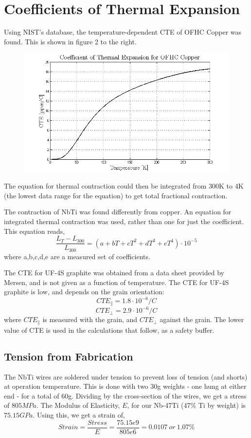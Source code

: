 \documentclass{article}
\begin{document}
\newpage
\section{Coefficients of Thermal Expansion}

Using NIST's database, the temperature-dependent CTE of OFHC Copper was found. This is shown in figure 2 to the right.

\begin{figure}
\includegraphics[width = .5\textwidth]{CTE_Copper_plot.png}
\end{figure} 

The equation for thermal contraction could then be integrated from 300K to 4K (the lowest data range for the equation) to get total fractional contraction. 

The contraction of NbTi was found differently from copper. An equation for integrated thermal contraction was used, rather than one for just the coefficient. This equation reads,
$$
\frac{L_{T} - L_{300}}{L_{300}} = (a + bT + cT^2 + dT^3 + eT^4) \cdot 10^{-5}
$$
where a,b,c,d,e are a measured set of coefficients. 

The CTE for UF-4S graphite was obtained from a data sheet provided by Mersen, and is not given as a function of temperature. The CTE for UF-4S graphite is low, and depends on the grain orientation:
$$
CTE_{\parallel} = 1.8 \cdot 10^{-6}/C 
$$
$$
CTE_{\perp} = 2.9 \cdot 10^{-6}/C
$$
where $CTE_{\parallel}$ is measured with the grain, and $CTE_{\perp}$ against the grain. The lower value of CTE is used in the calculations that follow, as a safety buffer.

\subsection{Tension from Fabrication}

The NbTi wires are soldered under tension to prevent loss of tension (and shorts) at operation temperature. This is done with two 30g weights - one hung at either end - for a total of 60g. Dividing by the cross-section of the wires, we get a stress of $805MPa$. The Modulus of Elasticity, $E$, for our Nb-47Ti (47\% Ti by weight) is $75.15GPa$. Using this, we get a strain of,
$$
Strain = \frac{Stress}{E} = \frac{75.15e9}{805e6} = 0.0107 \ or \ 1.07\%
$$
\end{document}
